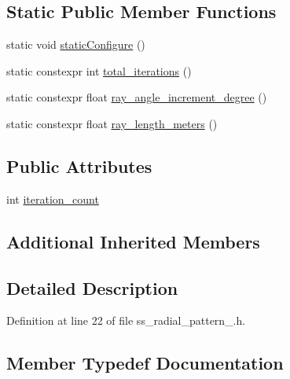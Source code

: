\subsection*{Static Public Member Functions}
\begin{DoxyCompactItemize}
\item 
static void \hyperlink{structsm__dance__bot__3_1_1SS3_1_1SsRadialPattern3_afecfec1c1156ee6dbc119c716a175c8c}{static\+Configure} ()
\item 
static constexpr int \hyperlink{structsm__dance__bot__3_1_1SS3_1_1SsRadialPattern3_af8111cc704f110ae11cededfa1b01192}{total\+\_\+iterations} ()
\item 
static constexpr float \hyperlink{structsm__dance__bot__3_1_1SS3_1_1SsRadialPattern3_ae3236f8f013b0467538598ab312c480b}{ray\+\_\+angle\+\_\+increment\+\_\+degree} ()
\item 
static constexpr float \hyperlink{structsm__dance__bot__3_1_1SS3_1_1SsRadialPattern3_ada7c98fca3b1af45dab6deab35d700ed}{ray\+\_\+length\+\_\+meters} ()
\end{DoxyCompactItemize}
\subsection*{Public Attributes}
\begin{DoxyCompactItemize}
\item 
int \hyperlink{structsm__dance__bot__3_1_1SS3_1_1SsRadialPattern3_a83ff2f4fce867bf0cfb53ec61fc37212}{iteration\+\_\+count}
\end{DoxyCompactItemize}
\subsection*{Additional Inherited Members}


\subsection{Detailed Description}


Definition at line 22 of file ss\+\_\+radial\+\_\+pattern\+\_.\+h.



\subsection{Member Typedef Documentation}
